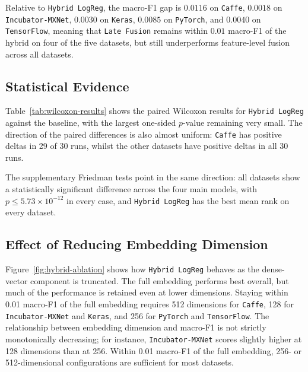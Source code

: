 \documentclass[10pt,a4paper]{article}
\begin{document}
Relative to \texttt{Hybrid LogReg}, the macro-F1 gap is $0.0116$ on \texttt{Caffe}, $0.0018$ on \texttt{Incubator-MXNet}, $0.0030$ on \texttt{Keras}, $0.0085$ on \texttt{PyTorch}, and $0.0040$ on \texttt{TensorFlow}, meaning that \texttt{Late Fusion} remains within $0.01$ macro-F1 of the hybrid on four of the five datasets, but still underperforms feature-level fusion across all datasets.


\subsection{Statistical Evidence}

Table~\ref{tab:wilcoxon-results} shows the paired Wilcoxon results for \texttt{Hybrid LogReg} against the baseline, with the largest one-sided $p$-value remaining very small. The direction of the paired differences is also almost uniform: \texttt{Caffe} has positive deltas in 29 of 30 runs, whilst the other datasets have positive deltas in all 30 runs.


\begin{table}[h]
\centering
\small
\setlength{\tabcolsep}{4pt}

\caption{Paired Wilcoxon results for \texttt{Hybrid LogReg} vs \texttt{Baseline NB}.}\label{tab:wilcoxon-results}
\end{table}

The supplementary Friedman tests point in the same direction: all datasets show a statistically significant difference across the four main models, with $p \leq 5.73 \times 10^{-12}$ in every case, and \texttt{Hybrid LogReg} has the best mean rank on every dataset.


\subsection{Effect of Reducing Embedding Dimension}\label{embedding-ablation}

Figure~\ref{fig:hybrid-ablation} shows how \texttt{Hybrid LogReg} behaves as the dense-vector component is truncated. The full embedding performs best overall, but much of the performance is retained even at lower dimensions. Staying within 0.01 macro-F1 of the full embedding requires 512 dimensions for \texttt{Caffe}, 128 for \texttt{Incubator-MXNet} and \texttt{Keras}, and 256 for \texttt{PyTorch} and \texttt{TensorFlow}.
The relationship between embedding dimension and macro-F1 is not strictly monotonically decreasing; for instance, \texttt{Incubator-MXNet} scores slightly higher at 128 dimensions than at 256. Within 0.01 macro-F1 of the full embedding, 256- or 512-dimensional configurations are sufficient for most datasets.
\end{document}
